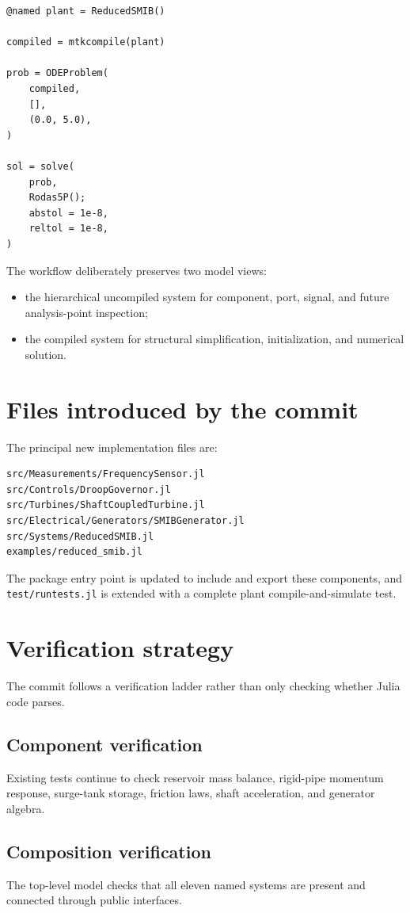 \documentclass[11pt,a4paper]{article}
\begin{document}
\begin{lstlisting}
@named plant = ReducedSMIB()

compiled = mtkcompile(plant)

prob = ODEProblem(
    compiled,
    [],
    (0.0, 5.0),
)

sol = solve(
    prob,
    Rodas5P();
    abstol = 1e-8,
    reltol = 1e-8,
)
\end{lstlisting}

The workflow deliberately preserves two model views:
\begin{itemize}
\item the hierarchical uncompiled system for component, port, signal, and future analysis-point inspection;
\item the compiled system for structural simplification, initialization, and numerical solution.
\end{itemize}

\section{Files introduced by the commit}
The principal new implementation files are:

\begin{verbatim}
src/Measurements/FrequencySensor.jl
src/Controls/DroopGovernor.jl
src/Turbines/ShaftCoupledTurbine.jl
src/Electrical/Generators/SMIBGenerator.jl
src/Systems/ReducedSMIB.jl
examples/reduced_smib.jl
\end{verbatim}

The package entry point is updated to include and export these components, and \texttt{test/runtests.jl} is extended with a complete plant compile-and-simulate test.

\section{Verification strategy}
The commit follows a verification ladder rather than only checking whether Julia code parses.

\subsection*{Component verification}
Existing tests continue to check reservoir mass balance, rigid-pipe momentum response, surge-tank storage, friction laws, shaft acceleration, and generator algebra.

\subsection*{Composition verification}
The top-level model checks that all eleven named systems are present and connected through public interfaces.
\end{document}
